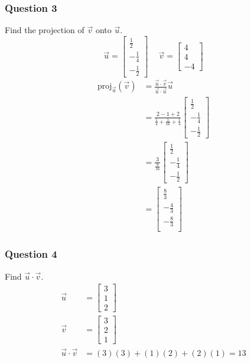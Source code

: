 \documentclass{math}
\begin{document}
\subsubsection*{Question 3}
Find the projection of \( \vec{v} \) onto \( \vec{u} \).
\[ \vec{u} = \begin{bmatrix}\frac{1}{2} \\ -\frac{1}{4} \\
  -\frac{1}{2}\end{bmatrix} \quad\
  \vec{v} = \begin{bmatrix}4 \\ 4 \\ -4\end{bmatrix} \]
\begin{align*}
  \text{proj}_{\vec{u}}(\vec{v}) &=
    \frac{\vec{u}\cdot\vec{v}}{\vec{u}\cdot\vec{u}}\vec{u} \\
  &= \frac{2-1+2}{\frac{1}{4}+\frac{1}{16}+\frac{1}{4}}\begin{bmatrix}
    \frac{1}{2} \\ -\frac{1}{4} \\ -\frac{1}{2}
  \end{bmatrix} \\
  &= \frac{3}{\frac{9}{16}}\begin{bmatrix}
    \frac{1}{2} \\ -\frac{1}{4} \\ -\frac{1}{2}
  \end{bmatrix} \\
  &= \begin{bmatrix}
    \frac{8}{3} \\
    -\frac{4}{3} \\
    -\frac{8}{3} \\
  \end{bmatrix}
\end{align*}

\subsubsection*{Question 4}
Find \( \vec{u}\cdot\vec{v} \).
\begin{align*}
  \vec{u} &= \begin{bmatrix}3 \\ 1 \\ 2\end{bmatrix} \\
  \vec{v} &= \begin{bmatrix}3 \\ 2 \\ 1\end{bmatrix} \\
  \vec{u}\cdot\vec{v} &= (3)(3)+(1)(2)+(2)(1) = 13
\end{align*}
\end{document}
